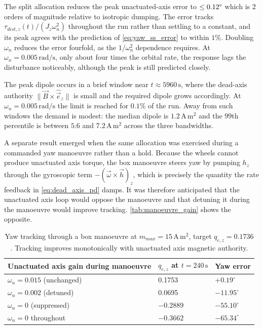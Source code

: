 The split allocation reduces the peak unactuated-axis error to $\leq0.12\degree$ which is $2$ orders of magnitude relative to isotropic dumping. The error tracks $\tau_{dist,z}(t)/(J_z\omega_n^2)$ throughout the run rather than settling to a constant, and its peak agrees with the prediction of \autoref{eq:yaw_ss_error} to within $1\%$. Doubling $\omega_n$ reduces the error fourfold, as the $1/\omega_n^2$ dependence requires. At $\omega_n = 0.005\,\mathrm{rad/s}$, only about four times the orbital rate, the response lags the disturbance noticeably, although the peak is still predicted closely.

The peak dipole occurs in a brief window near $t \approx 5960\,\mathrm{s}$, where the dead-axis authority $\|\vec{B}\times\hat{\vec{e}}_z\|$ is small and the required dipole grows accordingly. At $\omega_n = 0.005\,\mathrm{rad/s}$ the limit is reached for $0.1\%$ of the run. Away from such windows the demand is modest: the median dipole is $1.2\,\mathrm{A\,m^2}$ and the $99$th percentile is between $5.6$ and $7.2\,\mathrm{A\,m^2}$ across the three bandwidths.

A separate result emerged when the same allocation was exercised during a commanded yaw manoeuvre rather than a hold. Because the wheels cannot produce unactuated axis torque, the box manoeuvre steers yaw by pumping $h_z$ through the gyroscopic term $-(\vec\omega\times\vec{h})_z$, which is precisely the quantity the rate feedback in \autoref{eq:dead_axis_pd} damps. It was therefore anticipated that the unactuated axis loop would oppose the manoeuvre and that detuning it during the manoeuvre would improve tracking. \autoref{tab:manoeuvre_gain} shows the opposite.

\begin{table}[h]
\centering
\begin{tabular}{@{}l l l@{}}
\hline
Unactuated axis gain during manoeuvre & $q_{e,z}$ at $t = 240\,\mathrm{s}$ & Yaw error \\
\hline
$\omega_n = 0.015$ (unchanged)      & 0.1753  & $+0.19^\circ$  \\
$\omega_n = 0.002$ (detuned)        & 0.0695  & $-11.95^\circ$ \\
$\omega_n = 0$ (suppressed)         & $-0.2889$ & $-55.10^\circ$ \\
$\omega_n = 0$ throughout           & $-0.3662$ & $-65.34^\circ$ \\
\hline
\end{tabular}
\caption{Yaw tracking through a box manoeuvre at $m_{max} = 15\,\mathrm{A\,m^2}$, target $q_{e,z} = 0.1736$. Tracking improves monotonically with unactuated axis magnetic authority.}
\label{tab:manoeuvre_gain}
\end{table}

